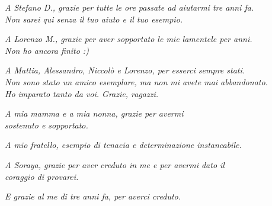 \documentclass[twoside,openright,titlepage,fleqn,
	headinclude,12pt,a4paper,BCOR=5mm,footinclude]{scrbook}
\begin{document}
\frenchspacing
\raggedbottom
{}
\pagestyle{plain}

\pagestyle{scrheadings}
\tableofcontents
\listoffigures
\cleardoublepage
\thispagestyle{empty}
\begin{flushright}
\null{}
\begin{center}

\emph{
A Stefano D., grazie per tutte le ore passate ad aiutarmi tre anni fa.\\
Non sarei qui senza il tuo aiuto e il tuo esempio.
} \vspace{1cm}

\emph{
A Lorenzo M., grazie per aver sopportato le mie lamentele per anni.\\
Non ho ancora finito :)
} \vspace{1cm}

\emph{
A Mattia, Alessandro, Niccolò e Lorenzo, per esserci sempre stati.\\
Non sono stato un amico esemplare, ma non mi avete mai abbandonato.\\
Ho imparato tanto da voi. Grazie, ragazzi.
} \vspace{1cm}

\emph{
A mia mamma e a mia nonna, grazie per avermi\\
sostenuto e sopportato.
} \vspace{1cm}

\emph{
A mio fratello, esempio di tenacia e determinazione instancabile.
} \vspace{1cm}

\emph{
A Soraya, grazie per aver creduto in me e per avermi dato il\\
coraggio di provarci.
} \vspace{1cm}

\emph{
E grazie al me di tre anni fa, per averci creduto.
}

\end{center}


\begin{comment}
	\emph{"Se avessi avuto più tempo, avrei scritto una lettera più breve." \break --- Blaise Pascal} \vspace{\stretch{2}}\null
\end{comment}
\end{flushright}
\cleardoublepage
\end{document}

